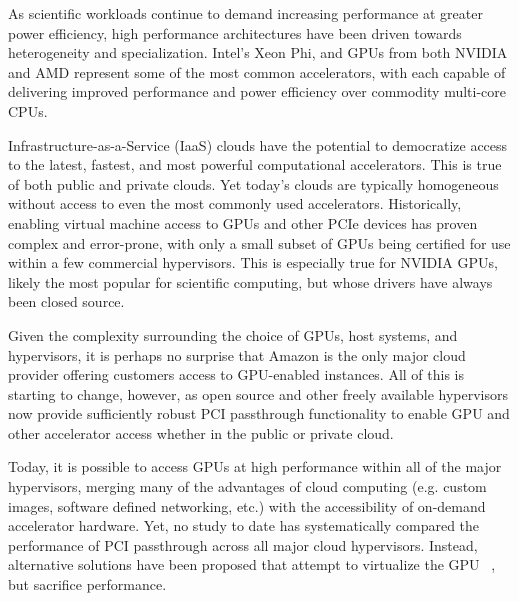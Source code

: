 


As scientific workloads continue to demand increasing performance at greater
power efficiency, high performance architectures have been driven towards heterogeneity and
specialization.  Intel's Xeon Phi, and GPUs from both NVIDIA and AMD represent some
of the most common accelerators, with each capable of delivering improved
performance and power efficiency over commodity multi-core CPUs. 




 Infrastructure-as-a-Service (IaaS) clouds have the potential to
democratize access to the latest, fastest, and most powerful computational
accelerators.  This is true of both public and private clouds.  Yet today's
clouds are typically homogeneous without access to even the most commonly used
accelerators.  Historically, enabling virtual machine access to GPUs and other PCIe devices has
proven complex and error-prone, with only a small subset of GPUs being
certified for use within a few commercial hypervisors.  This is especially true
for NVIDIA GPUs, likely the most popular for scientific computing, but whose
drivers have always been closed source.  

Given the complexity surrounding the choice of GPUs, host systems, and
hypervisors, it is perhaps no surprise that Amazon is the only major cloud
provider offering customers access to GPU-enabled instances.  All of this is
starting to change, however, as open source and other freely available
hypervisors now provide sufficiently robust PCI passthrough functionality to
enable GPU and other accelerator access whether in the public or private cloud.

Today, it is possible to access GPUs at high performance within all of
the major hypervisors, merging many of the advantages of cloud computing (e.g. custom
images, software defined networking, etc.)  with
the accessibility of on-demand accelerator hardware.  Yet, no study to date has
systematically compared the performance of PCI passthrough across all major
cloud hypervisors.  Instead, alternative solutions have been proposed that
attempt to virtualize the GPU~\cite{Duato2010rc}
, but sacrifice performance.

